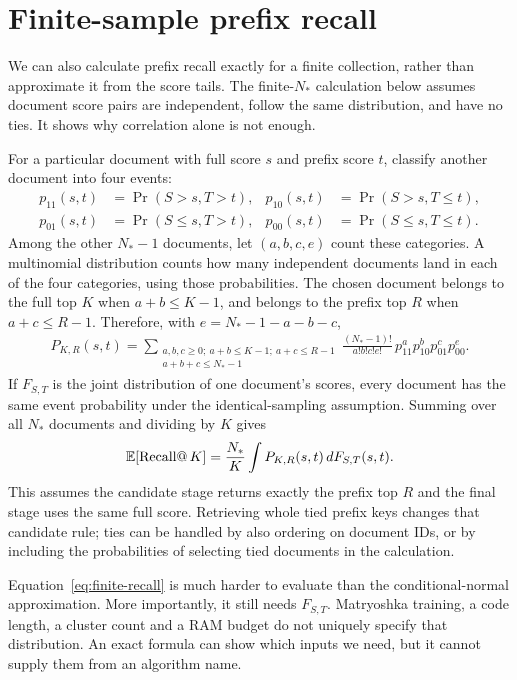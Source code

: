 \section{Finite-sample prefix recall}
We can also calculate prefix recall exactly for a finite collection, rather than approximate
it from the score tails. The finite-$N_*$ calculation below assumes document score pairs
are independent, follow the same distribution, and have no ties. It shows why correlation
alone is not enough.

For a particular document with full score $s$ and prefix score $t$, classify another document
into four events:
\begin{align*}
p_{11}(s,t)&=\Pr(S>s,T>t),&p_{10}(s,t)&=\Pr(S>s,T\leq t),\\
p_{01}(s,t)&=\Pr(S\leq s,T>t),&p_{00}(s,t)&=\Pr(S\leq s,T\leq t).
\end{align*}
Among the other $N_*-1$ documents, let $(a,b,c,e)$ count these categories. A multinomial distribution counts how many independent documents land in each of the four categories, using those probabilities. The chosen document belongs to the full
top $K$ when $a+b\leq K-1$, and belongs to the prefix top $R$ when $a+c\leq R-1$.
Therefore, with $e=N_*-1-a-b-c$,
\begin{align}
P_{K,R}(s,t)=
\sum_{\substack{a,b,c\geq0;\ a+b\leq K-1;\ a+c\leq R-1\\a+b+c\leq N_*-1}}
\frac{(N_*-1)!}{a!b!c!e!}\,
p_{11}^{a}p_{10}^{b}p_{01}^{c}p_{00}^{e}.
\end{align}
If $F_{S,T}$ is the joint distribution of one document's scores, every document has the same event probability under the identical-sampling assumption. Summing over all $N_*$ documents and dividing by $K$ gives
\begin{equation}
\mathbb E[\operatorname{Recall@}K]=
\frac{N_*}{K}\int P_{K,R}(s,t)\,dF_{S,T}(s,t).
\label{eq:finite-recall}
\end{equation}
This assumes the candidate stage returns exactly the prefix top $R$ and the final stage uses
the same full score. Retrieving whole tied prefix keys changes that candidate rule; ties can
be handled by also ordering on document IDs, or by including the probabilities of selecting
tied documents in the calculation.

Equation~\eqref{eq:finite-recall} is much harder to evaluate than the conditional-normal
approximation. More importantly, it still needs $F_{S,T}$. Matryoshka training, a code length,
a cluster count and a RAM budget do not uniquely specify that distribution. An exact formula can show which inputs we need, but it cannot supply them from an
algorithm name.

